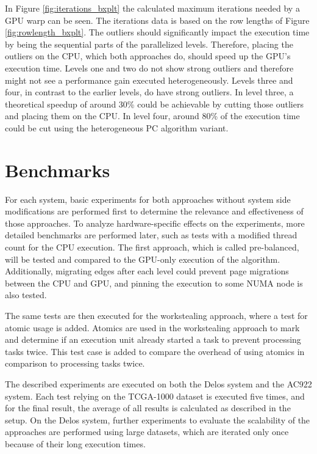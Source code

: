 In Figure \ref{fig:iterations_bxplt} the calculated maximum iterations needed by a GPU warp can be seen. The iterations data is based on the row lengths of Figure \ref{fig:rowlength_bxplt}. The outliers should significantly impact the execution time by being the sequential parts of the parallelized levels. Therefore, placing the outliers on the CPU, which both approaches do, should speed up the GPU's execution time. Levels one and two do not show strong outliers and therefore might not see a performance gain executed heterogeneously. Levels three and four, in contrast to the earlier levels, do have strong outliers. In level three, a theoretical speedup of around 30\% could be achievable by cutting those outliers and placing them on the CPU. In level four, around 80\% of the execution time could be cut using the heterogeneous PC algorithm variant.

\section{Benchmarks}
\label{chap:benchmarks}
For each system, basic experiments for both approaches without system side modifications are performed first to determine the relevance and effectiveness of those approaches. To analyze hardware-specific effects on the experiments, more detailed benchmarks are performed later, such as tests with a modified thread count for the CPU execution.
The first approach, which is called pre-balanced, will be tested and compared to the GPU-only execution of the algorithm. Additionally, migrating edges after each level could prevent page migrations between the CPU and GPU, and pinning the execution to some NUMA node is also tested.

The same tests are then executed for the workstealing approach, where a test for atomic usage is added. Atomics are used in the workstealing approach to mark and determine if an execution unit already started a task to prevent processing tasks twice. This test case is added to compare the overhead of using atomics in comparison to processing tasks twice.

The described experiments are executed on both the Delos system and the AC922 system. Each test relying on the TCGA-1000 dataset is executed five times, and for the final result, the average of all results is calculated as described in the setup. On the Delos system, further experiments to evaluate the scalability of the approaches are performed using large datasets, which are iterated only once because of their long execution times.

